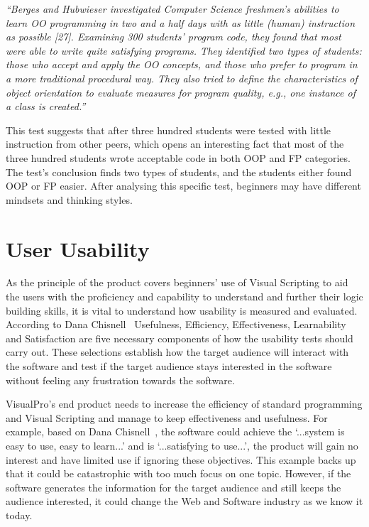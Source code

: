 \documentclass[12pt]{report} %
\begin{document}
			\begin{center}
				\textit{``Berges and Hubwieser investigated Computer Science freshmen’s abilities to learn OO programming in two and a half days with as little (human) instruction as possible [27]. Examining 300 students’ program code, they found that most were able to write quite satisfying programs. They identified two types of students: those who accept and apply the OO concepts, and those who prefer to program in a more traditional procedural way. They also tried to define the characteristics of object orientation to evaluate measures for program quality, e.g., one instance of a class is created.''}~\cite{vogel-heuser_evaluation_2013}
			\end{center}

			This test suggests that after three hundred students were tested with little instruction from other peers, which opens an interesting fact that most of the three hundred students wrote acceptable code in both OOP and FP categories. The test's conclusion finds two types of students, and the students either found OOP or FP easier. After analysing this specific test, beginners may have different mindsets and thinking styles.
			
	\section{User Usability}
		As the principle of the product covers beginners' use of Visual Scripting to aid the users with the proficiency and capability to understand and further their logic building skills, it is vital to understand how usability is measured and evaluated. According to Dana Chisnell~\cite{chisnell_dana_handbook_2008} Usefulness, Efficiency, Effectiveness, Learnability and Satisfaction are five necessary components of how the usability tests should carry out. These selections establish how the target audience will interact with the software and test if the target audience stays interested in the software without feeling any frustration towards the software. 
			
		VisualPro's end product needs to increase the efficiency of standard programming and Visual Scripting and manage to keep effectiveness and usefulness. For example, based on Dana Chisnell~\cite{chisnell_dana_handbook_2008}, the software could achieve the `...system is easy to use, easy to learn...' and is `...satisfying to use...', the product will gain no interest and have limited use if ignoring these objectives. This example backs up that it could be catastrophic with too much focus on one topic. However, if the software generates the information for the target audience and still keeps the audience interested, it could change the Web and Software industry as we know it today.
\end{document}
